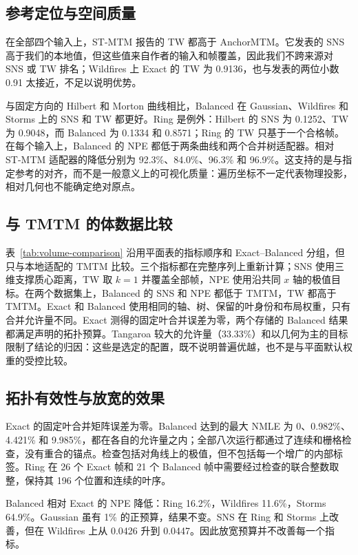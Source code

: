 \documentclass[fontset=none,zihao=5,a4paper]{ctexart}
\begin{document}
\subsection{参考定位与空间质量}
在全部四个输入上，ST-MTM 报告的 TW 都高于 AnchorMTM。它发表的 SNS 高于我们的本地值，但这些值来自作者的输入和帧覆盖，因此我们不跨来源对 SNS 或 TW 排名；Wildfires 上 Exact 的 TW 为 0.9136，也与发表的两位小数 0.91 太接近，不足以说明优势。

与固定方向的 Hilbert 和 Morton 曲线相比，Balanced 在 Gaussian、Wildfires 和 Storms 上的 SNS 和 TW 都更好。Ring 是例外：Hilbert 的 SNS 为 0.1252、TW 为 0.9048，而 Balanced 为 0.1334 和 0.8571；Ring 的 TW 只基于一个合格帧。在每个输入上，Balanced 的 NPE 都低于两条曲线和两个合并树适配器。相对 ST-MTM 适配器的降低分别为 92.3\%、84.0\%、96.3\% 和 96.9\%。这支持的是与指定参考的对齐，而不是一般意义上的可视化质量：遍历坐标不一定代表物理投影，相对几何也不能确定绝对原点。

\subsection{与 TMTM 的体数据比较}
表~\ref{tab:volume-comparison} 沿用平面表的指标顺序和 Exact--Balanced 分组，但只与本地适配的 TMTM 比较。三个指标都在完整序列上重新计算；SNS 使用三维支撑质心距离，TW 取 $k=1$ 并覆盖全部帧，NPE 使用沿共同 $x$ 轴的极值目标。在两个数据集上，Balanced 的 SNS 和 NPE 都低于 TMTM，TW 都高于 TMTM。Exact 和 Balanced 使用相同的轴、树、保留的叶身份和布局权重，只有合并允许量不同。Exact 测得的固定叶合并误差为零，两个存储的 Balanced 结果都满足声明的拓扑预算。Tangaroa 较大的允许量（33.33\%）和以几何为主的目标限制了结论的归因：这些是选定的配置，既不说明普遍优越，也不是与平面默认权重的受控比较。

\subsection{拓扑有效性与放宽的效果}
Exact 的固定叶合并矩阵误差为零。Balanced 达到的最大 NMLE 为 0、0.982\%、4.421\% 和 9.985\%，都在各自的允许量之内；全部八次运行都通过了连续和栅格检查，没有重合的锚点。检查包括对角线上的极值，但不包括每一个增广的内部标签。Ring 在 26 个 Exact 帧和 21 个 Balanced 帧中需要经过检查的联合整数取整，保持其 196 个位置和连续的叶序。

Balanced 相对 Exact 的 NPE 降低：Ring 16.2\%，Wildfires 11.6\%，Storms 64.9\%。Gaussian 虽有 1\% 的正预算，结果不变。SNS 在 Ring 和 Storms 上改善，但在 Wildfires 上从 0.0426 升到 0.0447。因此放宽预算并不改善每一个指标。
\end{document}
